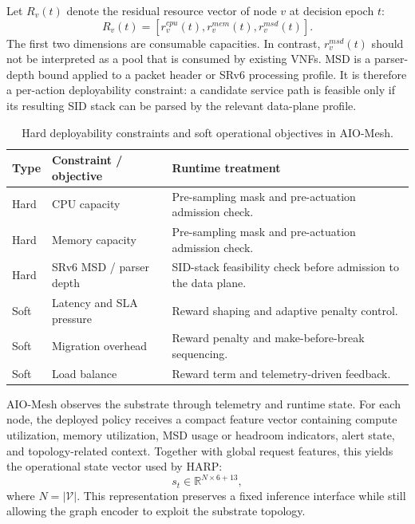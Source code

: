 \documentclass[final,5p]{elsarticle}
\begin{document}
Let \(R_v(t)\) denote the residual resource vector of node \(v\) at decision epoch \(t\):
\begin{equation}
    R_v(t) = \left[r_v^{cpu}(t), r_v^{mem}(t), r_v^{msd}(t)\right].
\end{equation}
The first two dimensions are consumable capacities. In contrast, \(r_v^{msd}(t)\) should not be interpreted as a pool that is consumed by existing VNFs. MSD is a parser-depth bound applied to a packet header or SRv6 processing profile. It is therefore a per-action deployability constraint: a candidate service path is feasible only if its resulting SID stack can be parsed by the relevant data-plane profile.


\begin{table}[t]
\centering
\caption{Hard deployability constraints and soft operational objectives in AIO-Mesh.}
\label{tab:hard_soft_constraints}
\renewcommand{\arraystretch}{1.12}
\small
\begin{tabular}{p{1.2cm}p{2.2cm}p{4.4cm}}
\toprule
\textbf{Type} & \textbf{Constraint / objective} & \textbf{Runtime treatment} \\
\midrule
Hard & CPU capacity & Pre-sampling mask and pre-actuation admission check. \\
Hard & Memory capacity & Pre-sampling mask and pre-actuation admission check. \\
Hard & SRv6 MSD / parser depth & SID-stack feasibility check before admission to the data plane. \\
Soft & Latency and SLA pressure & Reward shaping and adaptive penalty control. \\
Soft & Migration overhead & Reward penalty and make-before-break sequencing. \\
Soft & Load balance & Reward term and telemetry-driven feedback. \\
\bottomrule
\end{tabular}
\end{table}

AIO-Mesh observes the substrate through telemetry and runtime state. For each node, the deployed policy receives a compact feature vector containing compute utilization, memory utilization, MSD usage or headroom indicators, alert state, and topology-related context. Together with global request features, this yields the operational state vector used by HARP:
\begin{equation}
    s_t \in \mathbb{R}^{N \times 6 + 13},
\end{equation}
where \(N = |\mathcal{V}|\). This representation preserves a fixed inference interface while still allowing the graph encoder to exploit the substrate topology.
\end{document}
